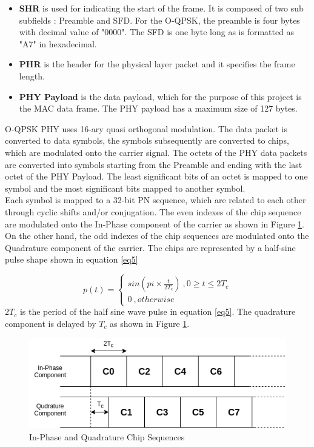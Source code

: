 \begin{itemize}
\item{ \textbf{\ac{SHR}} is used for indicating the start of the frame. 
It is composed of two sub subfields : Preamble and \ac{SFD}.
For the O-QPSK, the preamble is four bytes with decimal value of "0000".
The SFD is one byte long as is formatted as "A7" in hexadecimal.}
\item{ \textbf{PHR} is the header for the physical layer packet and it specifies the frame length.}
\item{ \textbf{PHY Payload} is the data payload, which for the purpose of this project is the MAC data frame.
The PHY payload has a maximum size of 127 bytes.}
\end{itemize}
 

O-QPSK PHY uses 16-ary quasi orthogonal modulation.
The data packet is converted to data symbols, the symbols subsequently are converted to chips, which are modulated onto the carrier signal.
The octets of the PHY data packets are converted into symbols starting from the Preamble and ending with the last octet of the PHY Payload.
The least significant bits of an octet is mapped to one symbol and the most significant bits mapped to another symbol.\\

Each symbol is mapped to a 32-bit \ac{PN} sequence, which are related to each other through cyclic shifts and/or conjugation.
The even indexes of the chip sequence are modulated onto the In-Phase component of the carrier as shown in Figure \ref{IQ_TC}.
On the other hand, the odd indexes of the chip sequences are modulated onto the Quadrature component of the carrier.
The chips are represented by a half-sine pulse shape shown in equation \ref{eq5}

\begin{equation}\label{eq5}
p(t) = 
\begin{cases} 
   sin( pi \times \frac{t}{2T_c})  \ ,0 \geq t \leq 2T_c \\
   0    \ ,otherwise
  \end{cases}
\end{equation}
$2T_c$ is the period of the half sine wave pulse in equation \ref{eq5}.
The quadrature component is delayed by $T_c$ as shown in Figure \ref{IQ_TC}.

\begin{figure}[h!]
\centering
\includegraphics[scale=0.6]{Figure/IQ_TC.png}
\caption{In-Phase and Quadrature Chip Sequences}
\label{IQ_TC}
\end{figure}

